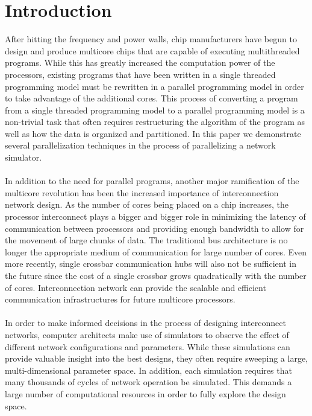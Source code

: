 \documentclass[twocolumn]{article}
\begin{document}
\section{Introduction}
After hitting the frequency and power walls, chip manufacturers have begun
to design and produce multicore chips that are capable of executing
multithreaded programs.  While this has greatly increased the computation power of the processors, existing programs that have been
written in a single threaded programming model must be rewritten in a
parallel programming model in order to take advantage of the additional cores.  This process of converting a program from a single threaded
programming model to a parallel programming model is a non-trivial task
that often requires restructuring the algorithm of the program as well as
how the data is organized and partitioned.  In this paper we demonstrate
several parallelization techniques in the process of parallelizing a
network simulator.\\
~\\
In addition to the need for parallel programs, another major ramification of the multicore revolution has been the
increased importance of interconnection network design.  As the number of
cores being placed on a chip increases, the processor interconnect plays a bigger and
bigger role in minimizing the latency of communication between processors
and providing enough bandwidth to allow for the movement of large chunks
of data. The traditional bus architecture is no longer the appropriate medium of communication for large number of cores. Even more recently, single crossbar communication hubs will also not be sufficient in the future since the cost of a single crossbar grows quadratically with the number of cores. Interconnection network can provide the scalable and efficient communication
infrastructures for future multicore processors. \\
~\\
In order to make informed decisions in the process of designing
interconnect networks, computer architects make use of simulators to
observe the effect of different network configurations and parameters.  While
these simulations can provide valuable insight into the best designs, they
often require sweeping a large, multi-dimensional parameter space.  In
addition, each simulation requires that many thousands of cycles
of network operation be simulated.  This demands a large number of computational
resources in order to fully explore the design space.\\
~\\
\end{document}
